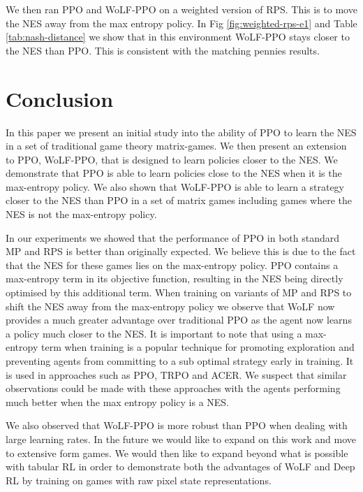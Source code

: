 \documentclass[conference]{IEEEtran}
\begin{document}
We then ran PPO and WoLF-PPO on a weighted version of RPS. This is to move the NES away from the max entropy policy. In Fig \ref{fig:weighted-rps-e1} and Table \ref{tab:nash-distance} we show that in this environment WoLF-PPO stays closer to the NES than PPO. This is consistent with the matching pennies results.

\section{Conclusion}


In this paper we present an initial study into the ability of PPO to learn the NES in a set of traditional game theory matrix-games. We then present an extension to PPO, WoLF-PPO, that is designed to learn policies closer to the NES. We demonstrate that PPO is able to learn policies close to the NES when it is the max-entropy policy. We also shown that WoLF-PPO is able to learn a strategy closer to the NES than PPO in a set of matrix games including games where the NES is not the max-entropy policy. 

In our experiments we showed that the performance of PPO in both standard MP and RPS is better than originally expected. We believe this is due to the fact that the NES for these games lies on the max-entropy policy. PPO contains a max-entropy term in its objective function, resulting in the NES being directly optimised by this additional term. When training on variants of MP and RPS to shift the NES away from the max-entropy policy we observe that WoLF now provides a much greater advantage over traditional PPO as the agent now learns a policy much closer to the NES. It is important to note that using a max-entropy term when training is a popular technique for promoting exploration and preventing agents from committing to a sub optimal strategy early in training. It is used in approaches such as PPO\cite{schulman2017proximal}, TRPO\cite{schulman2015trust} and ACER\cite{Wang2017SampleEA}. We suspect that similar observations could be made with these approaches with the agents performing much better when the max entropy policy is a NES. 

We also observed that WoLF-PPO is more robust than PPO when dealing with large learning rates. In the future we would like to expand on this work and move to extensive form games. We would then like to expand beyond what is possible with tabular RL in order to demonstrate both the advantages of WoLF and Deep RL by training on games with raw pixel state representations.





\end{document}
